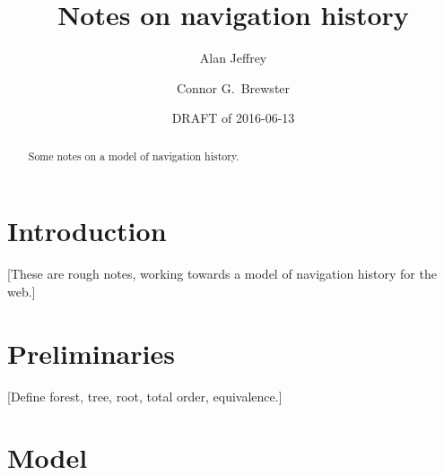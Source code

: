 \documentclass{article}
\title{Notes on navigation history}
\author{%
  Alan Jeffrey
  \and
  Connor G.~Brewster
}
\date{DRAFT of 2016-06-13}
\begin{document}
\maketitle

\begin{abstract}
  Some notes on a model of navigation history.
\end{abstract}

\section{Introduction}

[These are rough notes, working towards a model of navigation history for the web.]

\section{Preliminaries}

[Define forest, tree, root, total order, equivalence.]

\section{Model}
\end{document}
